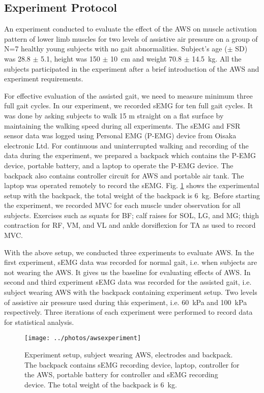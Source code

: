 \documentclass[letterpaper, 10 pt, conference]{ieeeconf}  %
\begin{document}
\subsection{Experiment Protocol}
An experiment conducted to evaluate the effect of the AWS on muscle activation pattern of lower limb muscles for two levels of assistive air pressure on a group of N=7 healthy young subjects with no gait abnormalities. Subject’s age ($\pm$ SD) was 28.8 $\pm$ 5.1, height was 150 $\pm$ \SI{10}{\centi\meter} and weight 70.8 $\pm$ \SI{14.5}{\kilogram}. All the subjects participated in the experiment after a brief introduction of the AWS and experiment requirements.

For effective evaluation of the assisted gait, we need to measure minimum three full gait cycles\cite{17}. In our experiment, we recorded sEMG for ten full gait cycles. It was done by asking subjects to walk 15 m straight on a flat surface by maintaining the walking speed during all experiments. The sEMG and FSR sensor data was logged using Personal EMG (P-EMG) device from Oisaka electronic Ltd. For continuous and uninterrupted walking and recording of the data during the experiment, we prepared a backpack which contains the P-EMG device, portable battery, and a laptop to operate the P-EMG device. The backpack also contains controller circuit for AWS and portable air tank. The laptop was operated remotely to record the sEMG. Fig. \ref{fig:experimentsetup} shows the experimental setup with the backpack, the total weight of the backpack is \SI{6}{\kilogram}. Before starting the experiment, we recorded MVC for each muscle under observation for all subjects. Exercises such as squats for BF; calf raises for SOL, LG, and MG; thigh contraction for RF, VM, and VL and ankle dorsiflexion for TA as used to record MVC. 

With the above setup, we conducted three experiments to evaluate AWS. In the first experiment, sEMG data was recorded for normal gait, i.e. when subjects are not wearing the AWS. It gives us the baseline for evaluating effects of AWS. In second and third experiment sEMG data was recorded for the assisted gait, i.e. subject wearing AWS with the backpack containing experiment setup. Two levels of assistive air pressure used during this experiment, i.e. \SI{60}{\kilo\pascal} and \SI{100}{\kilo\pascal} respectively. Three iterations of each experiment were performed to record data for statistical analysis. 



\begin{figure}
	\centering
	\texttt{[image: ../photos/awsexperiment]}
	\caption{Experiment setup, subject wearing AWS, electrodes and backpack. The backpack contains sEMG recording device, laptop, controller for the AWS, portable battery for controller and sEMG recording device. The total weight of the backpack is \SI{6}{\kilogram}.}
	\label{fig:experimentsetup}
\end{figure}
\end{document}
